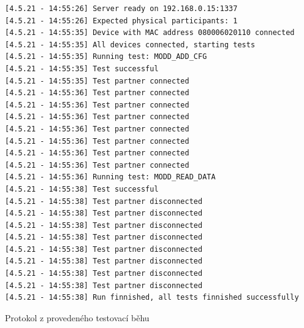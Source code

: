 \begin{listing}[p]
    \centering
    \begin{verbatim}
[4.5.21 - 14:55:26] Server ready on 192.168.0.15:1337
[4.5.21 - 14:55:26] Expected physical participants: 1
[4.5.21 - 14:55:35] Device with MAC address 080006020110 connected
[4.5.21 - 14:55:35] All devices connected, starting tests
[4.5.21 - 14:55:35] Running test: MODD_ADD_CFG
[4.5.21 - 14:55:35] Test successful
[4.5.21 - 14:55:35] Test partner connected
[4.5.21 - 14:55:36] Test partner connected
[4.5.21 - 14:55:36] Test partner connected
[4.5.21 - 14:55:36] Test partner connected
[4.5.21 - 14:55:36] Test partner connected
[4.5.21 - 14:55:36] Test partner connected
[4.5.21 - 14:55:36] Test partner connected
[4.5.21 - 14:55:36] Test partner connected
[4.5.21 - 14:55:36] Running test: MODD_READ_DATA
[4.5.21 - 14:55:38] Test successful
[4.5.21 - 14:55:38] Test partner disconnected
[4.5.21 - 14:55:38] Test partner disconnected
[4.5.21 - 14:55:38] Test partner disconnected
[4.5.21 - 14:55:38] Test partner disconnected
[4.5.21 - 14:55:38] Test partner disconnected
[4.5.21 - 14:55:38] Test partner disconnected
[4.5.21 - 14:55:38] Test partner disconnected
[4.5.21 - 14:55:38] Test partner disconnected
[4.5.21 - 14:55:38] Run finnished, all tests finnished successfully
    \end{verbatim}
    \caption{Protokol z provedeného testovací běhu}
    \label{listing:run_log}
\end{listing}